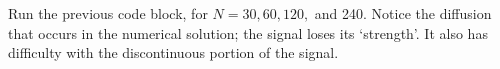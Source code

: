 \begin{problem}
	Run the previous code block, for $N = 30, 60, 120, $ and 240. Notice the diffusion that occurs in the numerical solution; the signal loses its `strength'. It also has difficulty with the discontinuous portion of the signal. 
\end{problem}


